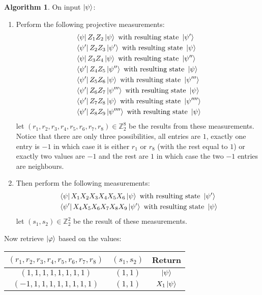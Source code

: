 \documentclass[12pt]{article}
\theoremstyle{plain}
\theoremstyle{definition}
\newtheorem{algorithm}[thm]{Algorithm}
\newcommand{\bb}[1]{\mathbb{#1}}
\begin{document}
\begin{algorithm}
	On input $\ket{\psi}$:
	\begin{enumerate}
		\item Perform the following projective measurements:
		\begin{align*}
			&\bra{\psi}Z_1Z_2\ket{\psi}\text{ with resulting state }\ket{\psi'}\\
			&\bra{\psi'}Z_2Z_3\ket{\psi'}\text{ with resulting state }\ket{\psi}\\
			&\bra{\psi}Z_3Z_4\ket{\psi}\text{ with resulting state }\ket{\psi''}\\
			&\bra{\psi'}Z_4Z_5\ket{\psi''}\text{ with resulting state }\ket{\psi}\\
			&\bra{\psi'}Z_5Z_6\ket{\psi}\text{ with resulting state }\ket{\psi'''}\\
			&\bra{\psi'}Z_6Z_7\ket{\psi'''}\text{ with resulting state }\ket{\psi}\\
			&\bra{\psi'}Z_7Z_8\ket{\psi}\text{ with resulting state }\ket{\psi''''}\\
			&\bra{\psi'}Z_8Z_9\ket{\psi''''}\text{ with resulting state }\ket{\psi}
		\end{align*}
		let $(r_1,r_2,r_3,r_4,r_5,r_6,r_7,r_8) \in \bb{Z}_2^8$ be the results from these measurements. Notice that there are only three possibilities, all entries are $1$, exactly one entry is $-1$ in which case it is either $r_1$ or $r_8$ (with the rest equal to $1$) or exactly two values are $-1$ and the rest are $1$ in which case the two $-1$ entries are neighbours.
		\item Then perform the following measurements:
		\begin{align*}
			&\bra{\psi}X_1X_2X_3X_4X_5X_6\ket{\psi}\text{ with resulting state }\ket{\psi'}\\
			&\bra{\psi'}X_4X_5X_6X_7X_8X_9\ket{\psi'}\text{ with resulting state }\ket{\psi}
		\end{align*}
		let $(s_1,s_2) \in \bb{Z}_2^2$ be the result of these measurements.
	\end{enumerate}
	\item Now retrieve $\ket{\varphi}$ based on the values:
	\begin{center}
		\begin{tabular}{|c|c|c|}
			\hline
			$(r_1,r_2,r_3,r_4,r_5,r_6,r_7,r_8)$ & $(s_1,s_2)$ & Return\\
			\hline
			$(1,1,1,1,1,1,1,1)$ & $(1,1)$ & $\ket{\psi}$\\
			\hline
			$(-1,1,1,1,1,1,1,1,1)$ & $(1,1)$ & $X_1\ket{\psi}$\\

\end{tabular}
\end{center}
\end{algorithm}
\end{document}
